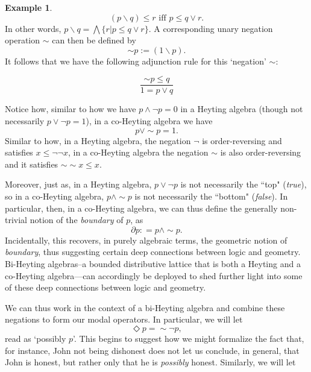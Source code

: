 \documentclass[11pt]{book}
\theoremstyle{definition}
\newtheorem{example}{Example}[section]
\theoremstyle{definition}
\theoremstyle{definition}
\theoremstyle{theorem}
\theoremstyle{definition}
\begin{document}
\begin{example}
	\begin{equation*}
	(p \smallsetminus q) \leq r \text{ iff } p \leq q \vee r. 
	\end{equation*}
	In other words, $p \smallsetminus q = \bigwedge \{r | p \leq q \vee r \}$. 
	A corresponding unary negation operation $\sim$ can then be defined by 
	\begin{equation}
	\sim p := (1 \smallsetminus p). 
	\end{equation}	  
	It follows that we have the following adjunction rule for this `negation' $\sim$: 
	\begin{center} 
		\begin{equation*}
		\frac{\sim p \leq q}{1 =p \vee q}
		\end{equation*}
	\end{center} 
	Notice how, similar to how we have $p \wedge \neg p = 0$ in a Heyting algebra (though not necessarily $p \vee \neg p = 1$), in a co-Heyting algebra we have 
	\begin{equation*}
	p \vee \sim p = 1.
	\end{equation*}
	Similar to how, in a Heyting algebra, the negation $\neg$ is order-reversing and satisfies $x \leq \neg \neg x$, in a co-Heyting algebra the negation $\sim$ is also order-reversing and it satisfies $\sim \sim x \leq x$. \par   
	Moreover, just as, in a Heyting algebra, $p \vee \neg p$ is not necessarily the ``top" (\textit{true}), so in a co-Heyting algebra, $p \wedge \sim p$ is not necessarily the ``bottom" (\textit{false}). In particular, then, in a co-Heyting algebra, we can thus define the generally non-trivial notion of the \textit{boundary} of $p$, as 
	\begin{equation*}
	\partial p : = p \wedge \sim p. 
	\end{equation*}
	Incidentally, this recovers, in purely algebraic terms, the geometric notion of \textit{boundary}, thus suggesting certain deep connections between logic and geometry. 
	Bi-Heyting algebras--a bounded distributive lattice that is both a Heyting and a co-Heyting algebra---can accordingly be deployed to shed further light into some of these deep connections between logic and geometry. \par 
	We can thus work in the context of a bi-Heyting algebra and combine these negations to form our modal operators. In particular, we will let
	\begin{equation*} 
	\Diamond p = \sim \neg p,
	\end{equation*} read as `possibly $p$'. This begins to suggest how we might formalize the fact that, for instance, John not being dishonest does not let us conclude, in general, that John is honest, but rather only that he is \textit{possibly} honest. Similarly, we will let 

\end{example}
\end{document}
